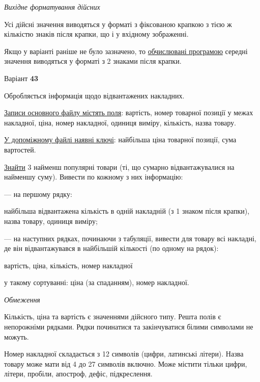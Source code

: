 \documentclass[11pt, ukrainian]{article}
\begin{document}
\textit{Вихідне форматування дійсних}

Усі дійсні значення виводяться у форматі з фіксованою крапкою з тією ж кількістю знаків після крапки, що і у вхідному зображенні.

Якщо у варіанті раніше не було зазначено, то \underline{обчислювані програмою} середні значення виводяться у форматі з 2 знаками після крапки.




\par
\newpage
{\center Варіант  \No \textbf { 43 }\par}
\bigskip
Обробляється інформація щодо відвантажених накладних.

\underline{Записи основного файлу містять поля}: вартість, номер товарної позиції у межах накладної, ціна, номер накладної, одиниця виміру, кількість, назва товару.

\underline{У допоміжному файлі наявні ключі}: найбільша ціна товарної позиції, сума вартостей.

\underline{Знайти} 3 найменш популярні товари (ті, що сумарно відвантажувалися на найменшу суму). Вивести по кожному з них інформацію:\par
{\noindent}--- на першому рядку:\par
найбільша відвантажена кількість в одній накладній (з 1 знаком після крапки),  назва товару, одиниця виміру;

{\noindent}--- на наступних рядках, починаючи з табуляції, вивести для товару всі накладні, де він відвантажувався в найбільшій кількості (по одному на рядок):\par
вартість, ціна, кількість, номер накладної

{\noindent}у такому сортуванні: ціна (за спаданням), номер накладної.


\bigskip\textit{Обмеження}

Кількість, ціна та вартість є значеннями дійсного типу.
Решта полів є непорожніми рядками.
Рядки починатися та закінчуватися білими символами не можуть.

Номер накладної складається з 12 символів (цифри, латинські літери).
Назва товару може мати від 4 до 27 символів включно.
Може містити тільки цифри, літери, пробіли, апостроф, дефіс, підкреслення.
\end{document}
